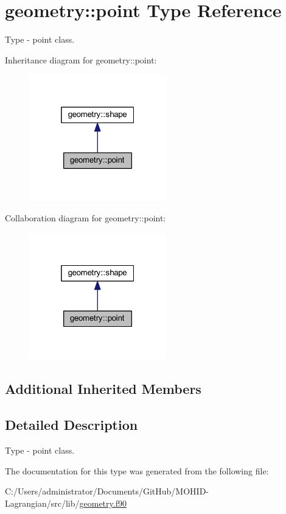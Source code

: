 \hypertarget{structgeometry_1_1point}{}\section{geometry\+:\+:point Type Reference}
\label{structgeometry_1_1point}


Type -\/ point class.  




Inheritance diagram for geometry\+:\+:point\+:\nopagebreak
\begin{figure}[H]
\begin{center}
\leavevmode
\includegraphics[width=169pt]{structgeometry_1_1point__inherit__graph}
\end{center}
\end{figure}


Collaboration diagram for geometry\+:\+:point\+:\nopagebreak
\begin{figure}[H]
\begin{center}
\leavevmode
\includegraphics[width=169pt]{structgeometry_1_1point__coll__graph}
\end{center}
\end{figure}
\subsection*{Additional Inherited Members}


\subsection{Detailed Description}
Type -\/ point class. 

The documentation for this type was generated from the following file\+:\begin{DoxyCompactItemize}
\item 
C\+:/\+Users/administrator/\+Documents/\+Git\+Hub/\+M\+O\+H\+I\+D-\/\+Lagrangian/src/lib/\mbox{\hyperlink{geometry_8f90}{geometry.\+f90}}\end{DoxyCompactItemize}
